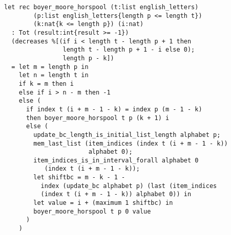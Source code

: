 \begin{verbatim}
let rec boyer_moore_horspool (t:list english_letters)
        (p:list english_letters{length p <= length t})
        (k:nat{k <= length p}) (i:nat)
  : Tot (result:int{result >= -1})
  (decreases %[(if i < length t - length p + 1 then
                length t - length p + 1 - i else 0);
                length p - k])
  = let m = length p in
    let n = length t in
    if k = m then i
    else if i > n - m then -1
    else (
      if index t (i + m - 1 - k) = index p (m - 1 - k)
      then boyer_moore_horspool t p (k + 1) i
      else (
        update_bc_length_is_initial_list_length alphabet p;
        mem_last_list (item_indices (index t (i + m - 1 - k))
                       alphabet 0);
        item_indices_is_in_interval_forall alphabet 0
           (index t (i + m - 1 - k));
        let shiftbc = m - k - 1 - 
          index (update_bc alphabet p) (last (item_indices
          (index t (i + m - 1 - k)) alphabet 0)) in
        let value = i + (maximum 1 shiftbc) in
        boyer_moore_horspool t p 0 value
      )
    )
\end{verbatim}

